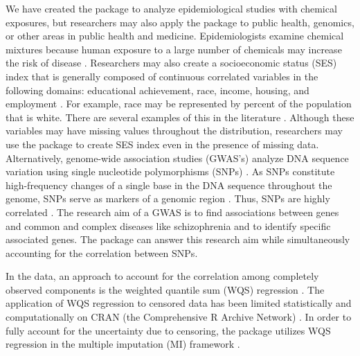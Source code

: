 We have created the  package to analyze epidemiological
studies with chemical exposures, but researchers may also apply the
package to public health, genomics, or other areas in public health and
medicine. Epidemiologists examine chemical mixtures because human
exposure to a large number of chemicals may increase the risk of disease
\citep{braunWhatCanEpidemiological2016}. Researchers may also create a
socioeconomic status (SES) index that is generally composed of
continuous correlated variables in the following domains: educational
achievement, race, income, housing, and employment
\citep{wheelerEstimatingAreaLevelSocioeconomic2017, wheelerExplainingVariationElevated2019}.
For example, race may be represented by percent of the population that
is white. There are several examples of this in the literature
\citep{wheelerBayesianDeprivationIndex2019, wheelerNeighborhoodDisadvantageTobacco2020}.
Although these variables may have missing values throughout the
distribution, researchers may use the  package to create SES
index even in the presence of missing data. Alternatively, genome-wide
association studies (GWAS's) analyze DNA sequence variation using single
nucleotide polymorphisms (SNPs) \citep{bushChapter11GenomeWide2012}. As
SNPs constitute high-frequency changes of a single base in the DNA
sequence throughout the genome, SNPs serve as markers of a genomic
region \citep{bushChapter11GenomeWide2012}. Thus, SNPs are highly
correlated
\citep{bushChapter11GenomeWide2012, ferberModelingDiscreteSurvival2015}.
The research aim of a GWAS is to find associations between genes and
common and complex diseases like schizophrenia and to identify specific
associated genes. The  package can answer this research aim
while simultaneously accounting for the correlation between SNPs.

In the data, an approach to account for the correlation among completely
observed components is the weighted quantile sum (WQS) regression
\citep{carricoCharacterizationWeightedQuantile2014, czarnotaAssessmentWeightedQuantile2015, genningsCohortStudyEvaluation2013}.
The application of WQS regression to censored data has been limited
statistically and computationally on CRAN (the Comprehensive R Archive
Network)
\citep{czarnotaAnalysisEnvironmentalChemical2015, hortonCOOccurringExposurePerchlorate2015, czarnotaWqsWeightedQuantile2015, renzettiGWQSGeneralizedWeighted2020a}.
In order to fully account for the uncertainty due to censoring, the
 package utilizes WQS regression in the multiple imputation
(MI) framework
\citep{ hargartenAccountingUncertaintyDue2020, hargartenMiWQSMultipleImputation2021}.

